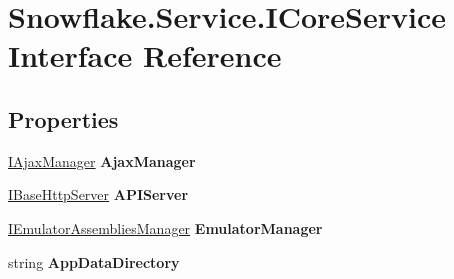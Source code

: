 \hypertarget{interface_snowflake_1_1_service_1_1_i_core_service}{}\section{Snowflake.\+Service.\+I\+Core\+Service Interface Reference}
\label{interface_snowflake_1_1_service_1_1_i_core_service}
\subsection*{Properties}
\begin{DoxyCompactItemize}
\item 
\hypertarget{interface_snowflake_1_1_service_1_1_i_core_service_aea60fe2d50107bc5e2e10f59072825d1}{}\hyperlink{interface_snowflake_1_1_service_1_1_manager_1_1_i_ajax_manager}{I\+Ajax\+Manager} {\bfseries Ajax\+Manager}\label{interface_snowflake_1_1_service_1_1_i_core_service_aea60fe2d50107bc5e2e10f59072825d1}

\item 
\hypertarget{interface_snowflake_1_1_service_1_1_i_core_service_a8f623918b823a0375b90345b4d14f07c}{}\hyperlink{interface_snowflake_1_1_service_1_1_http_server_1_1_i_base_http_server}{I\+Base\+Http\+Server} {\bfseries A\+P\+I\+Server}\label{interface_snowflake_1_1_service_1_1_i_core_service_a8f623918b823a0375b90345b4d14f07c}

\item 
\hypertarget{interface_snowflake_1_1_service_1_1_i_core_service_a1a74e833f678a36e818d43773be254ed}{}\hyperlink{interface_snowflake_1_1_service_1_1_manager_1_1_i_emulator_assemblies_manager}{I\+Emulator\+Assemblies\+Manager} {\bfseries Emulator\+Manager}\label{interface_snowflake_1_1_service_1_1_i_core_service_a1a74e833f678a36e818d43773be254ed}

\item 
\hypertarget{interface_snowflake_1_1_service_1_1_i_core_service_aa75d8e327c2802ecd447e130867fb1ea}{}string {\bfseries App\+Data\+Directory}\label{interface_snowflake_1_1_service_1_1_i_core_service_aa75d8e327c2802ecd447e130867fb1ea}


\end{DoxyCompactItemize}
